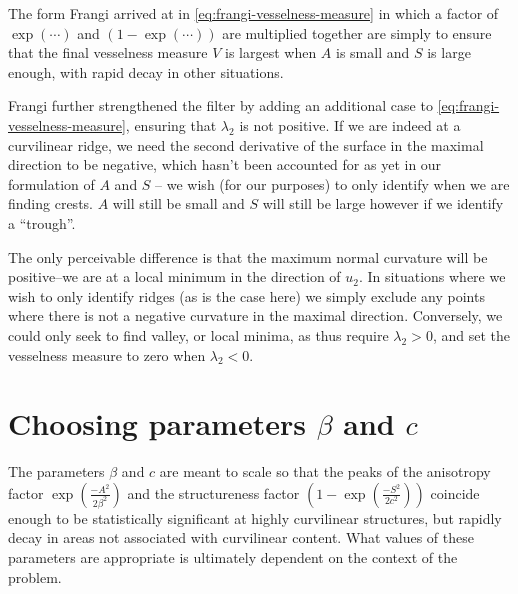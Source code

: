 The form Frangi arrived at in \cref{eq:frangi-vesselness-measure} in which a factor of $\exp(\cdots)$ and $(1 - \exp(\cdots))$ are multiplied together are simply to ensure that the final vesselness measure $V$ is largest when $A$ is small and $S$ is large enough, with rapid decay in other situations.

Frangi further strengthened the filter by adding an additional case to \cref{eq:frangi-vesselness-measure}, ensuring that $\lambda_2$ is not positive. If we are indeed at a curvilinear ridge, we need the second derivative of the surface in the maximal direction to be negative, which hasn't been accounted for as yet in our formulation of $A$ and $S$ -- we wish (for our purposes) to only identify when we are finding crests. $A$ will still be small and $S$ will still be large however if we identify a ``trough''.

The only perceivable difference is that the maximum normal curvature will be positive--we are at a local minimum in the direction of $u_2$. In situations where we wish to only identify ridges (as is the case here) we simply exclude any points where there is not a negative curvature in the maximal direction. Conversely, we could only seek to find valley, or local minima, as thus require $\lambda_2 > 0$, and set the vesselness measure to zero when $\lambda_2 < 0$.

\section{Choosing parameters $\beta$ and $c$}

The parameters $\beta$ and $c$ are meant to scale so that the peaks of the anisotropy factor $\exp(\frac{-A^2}{2\beta^2})$ and the structureness factor $(1-\exp\left(\frac{-S^2}{2c^2}\right))$ coincide enough to be statistically significant at highly curvilinear structures, but rapidly decay in areas not associated with curvilinear content. What values of these parameters are appropriate is ultimately dependent on the context of the problem.

